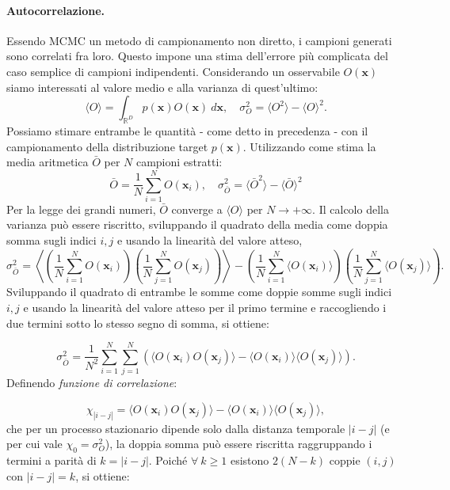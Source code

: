 \paragraph*{Autocorrelazione.}

Essendo MCMC un metodo di campionamento non diretto, i campioni generati sono correlati fra loro. Questo impone una stima dell'errore più complicata del caso semplice di campioni indipendenti. Considerando un osservabile $O(\mathbf{x})$ siamo interessati al valore medio e alla varianza di quest'ultimo:
\begin{equation}
    \langle O \rangle = \int_{\mathbb{R}^D} p(\mathbf{x}) O(\mathbf{x}) \ d \mathbf{x}, \quad \sigma^2_O = \langle O^2\rangle - \langle O \rangle ^2 .
\end{equation}
Possiamo stimare entrambe le quantità - come detto in precedenza - con il campionamento della distribuzione target $p(\mathbf{x})$. Utilizzando come stima la media aritmetica $\bar{O}$ per $N$ campioni estratti:
\begin{equation}
    \bar{O} = \frac{1}{N}\sum_{i=1}^{N} O(\mathbf{x}_i), \quad  \sigma^2_{\bar{O}} = \langle {\bar{O}}^2\rangle - \langle \bar{O} \rangle ^2
\end{equation} Per la legge dei grandi numeri, $\bar{O}$ converge a $\langle O \rangle$ per $N \to +\infty$. Il calcolo della varianza può essere riscritto, sviluppando il quadrato della media come doppia somma sugli indici $i,j$ e usando la linearità del valore atteso,
\begin{equation}
    \sigma^2_{\bar{O}} =
    \left\langle \left( \frac{1}{N}\sum_{i=1}^N O(\mathbf{x}_i) \right) \left( \frac{1}{N}\sum_{j=1}^N O(\mathbf{x}_j) \right)\right\rangle
    - \left( \frac{1}{N}\sum_{i=1}^N \langle O(\mathbf{x}_i) \rangle \right) \left( \frac{1}{N}\sum_{j=1}^N \langle O(\mathbf{x}_j) \rangle \right) .
\end{equation} Sviluppando il quadrato di entrambe le somme come doppie somme sugli indici $i,j$ e usando la linearità del valore atteso per il primo termine e raccogliendo i due termini sotto lo stesso segno di somma, si ottiene:

\begin{equation}
    \sigma^2_{\bar{O}} = \frac{1}{N^2} \sum_{i=1}^{N}\sum_{j=1}^{N} \left( \langle O(\mathbf{x}_i) O(\mathbf{x}_j) \rangle - \langle O(\mathbf{x}_i) \rangle \langle O(\mathbf{x}_j) \rangle \right).
\end{equation} Definendo \emph{funzione di correlazione}:

\begin{equation}
    \chi_{|i-j|} = \langle O(\mathbf{x}_i) O(\mathbf{x}_j)\rangle - \langle O(\mathbf{x}_i) \rangle \langle O(\mathbf{x}_j) \rangle,
    \label{eq:cor}
\end{equation} che per un processo stazionario dipende solo dalla distanza temporale $|i-j|$ (e per cui vale $\chi_0 = \sigma^2_O$), la doppia somma può essere riscritta raggruppando i termini a parità di $k=|i-j|$. Poiché $\forall \ k \geq 1$ esistono $2(N-k)$ coppie $(i,j)$ con $|i-j|=k$, si ottiene:

